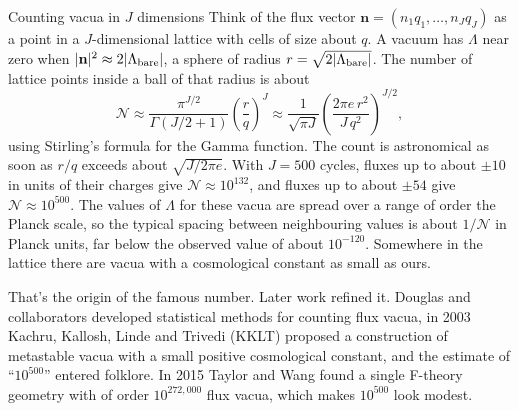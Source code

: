 

\begin{mathbox}{Counting vacua in $J$ dimensions}
Think of the flux vector $\mathbf{n}=(n_1q_1,\dots,n_Jq_J)$ as a point in a $J$-dimensional lattice with cells of size about $q$. A vacuum has $\Lambda$ near zero when $|\mathbf n|^2\approx2|\Lambda_{\rm bare}|$, a sphere of radius $r=\sqrt{2|\Lambda_{\rm bare}|}$. The number of lattice points inside a ball of that radius is about
\[
\mathcal{N}\approx\frac{\pi^{J/2}}{\Gamma(J/2+1)}\left(\frac{r}{q}\right)^{J}\approx\frac{1}{\sqrt{\pi J}}\left(\frac{2\pi e\,r^2}{J\,q^2}\right)^{J/2},
\]
using Stirling's formula for the Gamma function. The count is astronomical as soon as $r/q$ exceeds about $\sqrt{J/2\pi e}$. With $J=500$ cycles, fluxes up to about $\pm10$ in units of their charges give $\mathcal N\approx10^{132}$, and fluxes up to about $\pm54$ give $\mathcal N\approx10^{500}$. The values of $\Lambda$ for these vacua are spread over a range of order the Planck scale, so the typical spacing between neighbouring values is about $1/\mathcal N$ in Planck units, far below the observed value of about $10^{-120}$. Somewhere in the lattice there are vacua with a cosmological constant as small as ours.
\end{mathbox}





That's the origin of the famous number. Later work refined it. Douglas and collaborators developed statistical methods for counting flux vacua, in 2003 Kachru, Kallosh, Linde and Trivedi (KKLT) proposed a construction of metastable vacua with a small positive cosmological constant, and the estimate of ``$10^{500}$'' entered folklore. In 2015 Taylor and Wang found a single F-theory geometry with of order $10^{272{,}000}$ flux vacua, which makes $10^{500}$ look modest.

